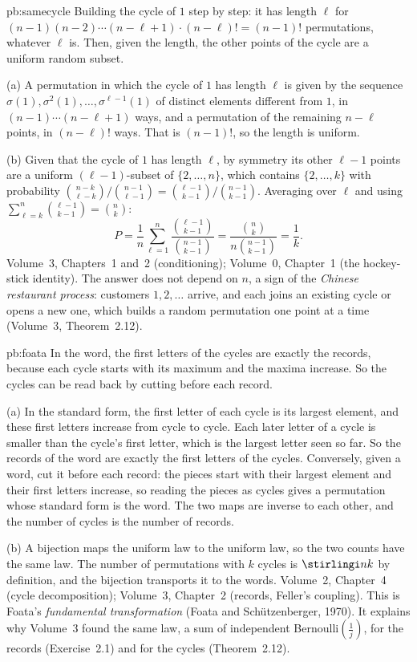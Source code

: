 \begin{solution}{pb:samecycle}
\idea Building the cycle of $1$ step by step: it has length $\ell$ for $(n-1)(n-2)\cdots(n-\ell+1)\cdot(n-\ell)!=(n-1)!$
permutations, whatever $\ell$ is. Then, given the length, the other points of the cycle are a uniform random subset.

\writeup (a) A permutation in which the cycle of $1$ has length $\ell$ is given by the sequence $\sigma(1),\sigma^2(1),\dots,\sigma^{\ell-1}(1)$
of distinct elements different from $1$, in $(n-1)\cdots(n-\ell+1)$ ways, and a permutation of the remaining $n-\ell$ points, in
$(n-\ell)!$ ways. That is $(n-1)!$, so the length is uniform.

(b) Given that the cycle of $1$ has length $\ell$, by symmetry its other $\ell-1$ points are a uniform $(\ell-1)$-subset of
$\{2,\dots,n\}$, which contains $\{2,\dots,k\}$ with probability $\binom{n-k}{\ell-k}/\binom{n-1}{\ell-1}=\binom{\ell-1}{k-1}/\binom{n-1}{k-1}$.
Averaging over $\ell$ and using $\sum_{\ell=k}^n\binom{\ell-1}{k-1}=\binom nk$:
\[
P=\frac1n\sum_{\ell=1}^n\frac{\binom{\ell-1}{k-1}}{\binom{n-1}{k-1}}=\frac{\binom nk}{n\binom{n-1}{k-1}}=\frac1k.
\]
\tools Volume~3, Chapters~1 and~2 (conditioning); Volume~0, Chapter~1 (the hockey-stick identity).
\leads The answer does not depend on $n$, a sign of the \emph{Chinese restaurant process}: customers $1,2,\dots$ arrive, and each
joins an existing cycle or opens a new one, which builds a random permutation one point at a time (Volume~3, Theorem~2.12).
\end{solution}

\begin{solution}{pb:foata}
\idea In the word, the first letters of the cycles are exactly the records, because each cycle starts with its maximum and
the maxima increase. So the cycles can be read back by cutting before each record.

\writeup (a) In the standard form, the first letter of each cycle is its largest element, and these first letters increase from
cycle to cycle. Each later letter of a cycle is smaller than the cycle's first letter, which is the largest letter seen so far.
So the records of the word are exactly the first letters of the cycles. Conversely, given a word, cut it before each record:
the pieces start with their largest element and their first letters increase, so reading the pieces as cycles gives a
permutation whose standard form is the word. The two maps are inverse to each other, and the number of cycles is the number of
records.

(b) A bijection maps the uniform law to the uniform law, so the two counts have the same law. The number of permutations with
$k$ cycles is $\stirlingi nk$ by definition, and the bijection transports it to the words.
\tools Volume~2, Chapter~4 (cycle decomposition); Volume~3, Chapter~2 (records, Feller's coupling).
\leads This is Foata's \emph{fundamental transformation} (Foata and Schützenberger, 1970). It explains why Volume~3 found the same
law, a sum of independent Bernoulli$(\frac1j)$, for the records (Exercise~2.1) and for the cycles
(Theorem~2.12).
\end{solution}

